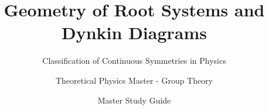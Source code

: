 
\usepackage{amsmath}
\usepackage{amssymb}
\usepackage{amsfonts}
\usepackage{physics}
\usepackage{hyperref}

\title{Geometry of Root Systems and Dynkin Diagrams}
\subtitle{Classification of Continuous Symmetries in Physics}
\author{Theoretical Physics Master - Group Theory}
\date{Master Study Guide}